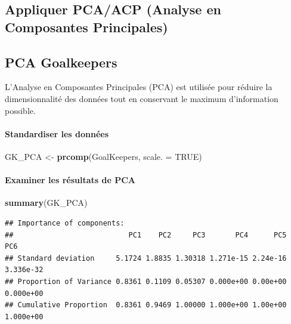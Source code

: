 \documentclass[
  6pt,
]{article}
\newenvironment{Shaded}{\begin{snugshade}}{\end{snugshade}}
\newcommand{\AttributeTok}[1]{\textcolor[rgb]{0.13,0.29,0.53}{#1}}
\newcommand{\ConstantTok}[1]{\textcolor[rgb]{0.56,0.35,0.01}{#1}}
\newcommand{\DecValTok}[1]{\textcolor[rgb]{0.00,0.00,0.81}{#1}}
\newcommand{\FunctionTok}[1]{\textcolor[rgb]{0.13,0.29,0.53}{\textbf{#1}}}
\newcommand{\NormalTok}[1]{#1}
\newcommand{\OtherTok}[1]{\textcolor[rgb]{0.56,0.35,0.01}{#1}}
\newcommand{\SpecialCharTok}[1]{\textcolor[rgb]{0.81,0.36,0.00}{\textbf{#1}}}
\newcommand{\StringTok}[1]{\textcolor[rgb]{0.31,0.60,0.02}{#1}}
\begin{document}
\subsection{Appliquer PCA/ACP (Analyse en Composantes
Principales)}\label{appliquer-pcaacp-analyse-en-composantes-principales}

\subsection{PCA Goalkeepers}\label{pca-goalkeepers}

L'Analyse en Composantes Principales (PCA) est utilisée pour réduire la
dimensionnalité des données tout en conservant le maximum d'information
possible.

\paragraph{Standardiser les données}\label{standardiser-les-donnuxe9es}

\begin{Shaded}
\begin{Highlighting}[]
\NormalTok{GK\_PCA }\OtherTok{\textless{}{-}} \FunctionTok{prcomp}\NormalTok{(GoalKeepers, }\AttributeTok{scale. =} \ConstantTok{TRUE}\NormalTok{)}
\end{Highlighting}
\end{Shaded}

\paragraph{Examiner les résultats de
PCA}\label{examiner-les-ruxe9sultats-de-pca}

\begin{Shaded}
\begin{Highlighting}[]
\FunctionTok{summary}\NormalTok{(GK\_PCA)}
\end{Highlighting}
\end{Shaded}

\begin{verbatim}
## Importance of components:
##                           PC1    PC2     PC3       PC4      PC5       PC6
## Standard deviation     5.1724 1.8835 1.30318 1.271e-15 2.24e-16 3.336e-32
## Proportion of Variance 0.8361 0.1109 0.05307 0.000e+00 0.00e+00 0.000e+00
## Cumulative Proportion  0.8361 0.9469 1.00000 1.000e+00 1.00e+00 1.000e+00
\end{verbatim}

\begin{Shaded}
\end{Shaded}
\end{document}
